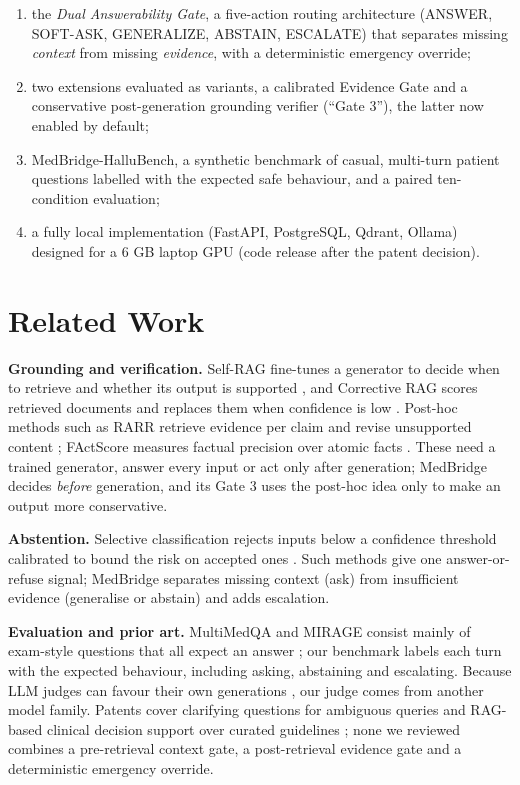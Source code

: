 \documentclass[conference]{IEEEtran}
\begin{document}
\begin{enumerate}
\item the \emph{Dual Answerability Gate}, a five-action routing architecture (ANSWER, SOFT-ASK, GENERALIZE, ABSTAIN, ESCALATE) that separates missing \emph{context} from missing \emph{evidence}, with a deterministic emergency override;
\item two extensions evaluated as variants, a calibrated Evidence Gate and a conservative post-generation grounding verifier (``Gate 3''), the latter now enabled by default;
\item MedBridge-HalluBench, a synthetic benchmark of casual, multi-turn patient questions labelled with the expected safe behaviour, and a paired ten-condition evaluation;
\item a fully local implementation (FastAPI, PostgreSQL, Qdrant, Ollama) designed for a 6 GB laptop GPU (code release after the patent decision).
\end{enumerate}

\section{Related Work}\label{sec:related}

\textbf{Grounding and verification.} Self-RAG fine-tunes a generator to decide when to retrieve and whether its output is supported \cite{asai2024selfrag}, and Corrective RAG scores retrieved documents and replaces them when confidence is low \cite{yan2024crag}. Post-hoc methods such as RARR retrieve evidence per claim and revise unsupported content \cite{gao2023rarr}; FActScore measures factual precision over atomic facts \cite{min2023factscore}. These need a trained generator, answer every input or act only after generation; MedBridge decides \emph{before} generation, and its Gate 3 uses the post-hoc idea only to make an output more conservative.

\textbf{Abstention.} Selective classification rejects inputs below a confidence threshold calibrated to bound the risk on accepted ones \cite{geifman2017selective}. Such methods give one answer-or-refuse signal; MedBridge separates missing context (ask) from insufficient evidence (generalise or abstain) and adds escalation.

\textbf{Evaluation and prior art.} MultiMedQA and MIRAGE consist mainly of exam-style questions that all expect an answer \cite{singhal2023llmclinical,xiong2024medrag}; our benchmark labels each turn with the expected behaviour, including asking, abstaining and escalating. Because LLM judges can favour their own generations \cite{zheng2023judging}, our judge comes from another model family. Patents cover clarifying questions for ambiguous queries \cite{zhang2024intuitdisambiguity} and RAG-based clinical decision support over curated guidelines \cite{paul2025glasshealthrag}; none we reviewed combines a pre-retrieval context gate, a post-retrieval evidence gate and a deterministic emergency override.
\end{document}
